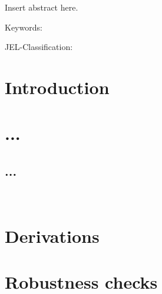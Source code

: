 \documentclass[12pt]{article}
\begin{document}

\makethesistitle

\makeacademicpage
\noindent Insert abstract here.

\par\vspace{4em}\noindent
{\color{zinc700}Keywords:} 
\par\noindent
{\color{zinc700}JEL-Classification:} 

\newpage

\section{Introduction}





\section{...}


\subsection{...}



\clearpage
 

\newpage~\appendix


\section{Derivations}

\section{Robustness checks}
\end{document}
